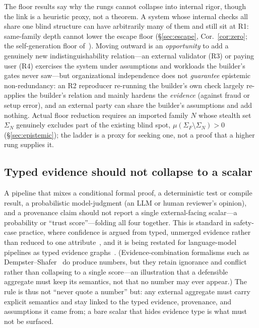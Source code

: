 \documentclass[11pt]{article}
\theoremstyle{definition}
\theoremstyle{remark}
\begin{document}
The floor results say why the rungs cannot collapse into internal rigor, though the link is a heuristic
proxy, not a theorem. A system whose internal checks all share one blind structure can have arbitrarily
many of them and still sit at R1: same-family depth cannot lower the escape floor
(\S\ref{sec:escape}, Cor.~\ref{cor:zero}; the self-generation floor of~\cite{matijasevic2026gg}). Moving outward is
an \emph{opportunity} to add a genuinely new indistinguishability relation---an external validator
(R3) or paying user (R4) exercises the system under assumptions and workloads the builder's gates never
saw---but organizational independence does not \emph{guarantee} epistemic non-redundancy: an R2
reproducer re-running the builder's own check largely re-applies the builder's relation and mainly
hardens the \emph{evidence} (against fraud or setup error), and an external party can share the
builder's assumptions and add nothing. Actual floor reduction requires an imported family $N$ whose
stealth set $\Sigma_N$ genuinely excludes part of the existing blind spot, $\mu(\Sigma_F\setminus\Sigma_N)>0$
(\S\ref{sec:epistemic}); the ladder is a proxy for seeking one, not a proof that a higher rung supplies it.

\subsection{Typed evidence should not collapse to a scalar}
A pipeline that mixes a conditional formal proof, a deterministic test or compile result, a
probabilistic model-judgment (an LLM or human reviewer's opinion), and a provenance claim should not
report a single external-facing scalar---a probability or ``trust score''---folding all four together.
This is standard in safety-case practice, where confidence is argued from typed, unmerged
evidence rather than reduced to one attribute~\cite{gsn,bloomfield2022}, and it is being restated for
language-model pipelines as typed evidence graphs~\cite{wang2026}. (Evidence-combination formalisms
such as Dempster--Shafer~\cite{shafer1976} do produce numbers, but they retain ignorance and conflict
rather than collapsing to a single score---an illustration that a defensible aggregate must keep its
semantics, not that no number may ever appear.) The rule is thus not ``never quote a number'' but:
any external aggregate must carry explicit semantics and stay linked to the typed evidence, provenance,
and assumptions it came from; a bare scalar that hides evidence type is what must not be surfaced.
\end{document}
